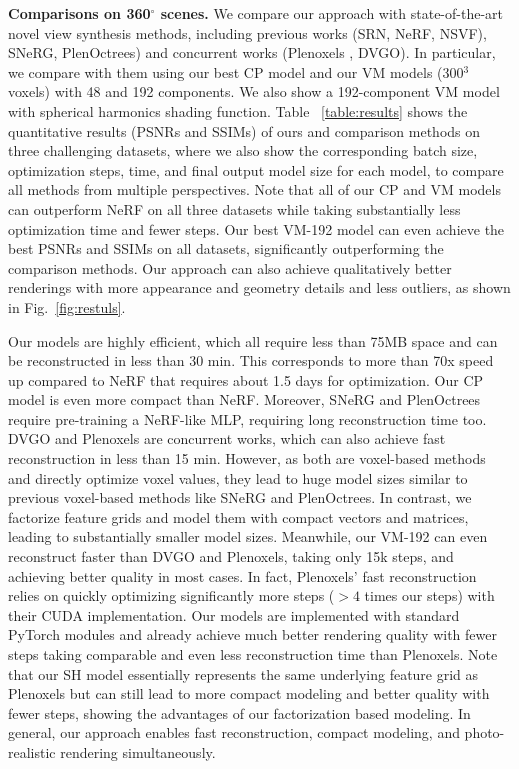 \documentclass[runningheads]{llncs}
\newcommand{\boldstartspace}[1]{\vspace{0.1in}\noindent\textbf{#1}}
\begin{document}
\boldstartspace{Comparisons on 360$^\circ$ scenes.}
We compare our approach with state-of-the-art novel view synthesis methods, including previous works (SRN\cite{sitzmann2019scene}, NeRF\cite{mildenhall2020nerf}, NSVF\cite{liu2020neural}), SNeRG\cite{hedman2021baking}, PlenOctrees\cite{yu2021plenoctrees}) and concurrent works (Plenoxels \cite{yu2021plenoxels}, DVGO\cite{sun2021direct}).
In particular, we compare with them using our best CP model and our VM models (300$^3$ voxels) with 48 and 192 components.
We also show a 192-component VM model with spherical harmonics shading function.
Table ~\ref{table:results} shows the quantitative results (PSNRs and SSIMs) of ours and comparison methods on three challenging datasets, where we also show the corresponding batch size, optimization steps, time, and final output model size for each model, to compare all methods from multiple perspectives. 
Note that all of our CP and VM models can outperform NeRF on all three datasets while taking substantially less optimization time and fewer steps.
Our best VM-192 model can even achieve the best PSNRs and SSIMs on all datasets, significantly outperforming the comparison methods.
Our approach can also achieve qualitatively better renderings with more appearance and geometry details and less outliers, as shown in 
Fig.~\ref{fig:restuls}.








Our models are highly efficient, which all require less than 75MB space and can be reconstructed in less than 30 min.
This corresponds to more than 70x speed up compared to NeRF that requires about 1.5 days for optimization.
Our CP model is even more compact than NeRF.
Moreover, SNeRG and PlenOctrees require pre-training a NeRF-like MLP, requiring long reconstruction time too.
DVGO and Plenoxels are concurrent works, which can also achieve fast reconstruction in less than 15 min. 
However, as both are voxel-based methods and directly optimize voxel values, they lead to huge model sizes 
similar to previous voxel-based methods like SNeRG and PlenOctrees.
In contrast, we factorize feature grids and model them with compact vectors and matrices, leading to substantially smaller model sizes.
Meanwhile, our VM-192 can even reconstruct faster than DVGO and Plenoxels, taking only 15k steps, and achieving better quality in most cases. 
In fact, Plenoxels' fast reconstruction relies on quickly optimizing significantly more steps ($>4$ times our steps) with their CUDA implementation. 
Our models are implemented with standard PyTorch modules and already achieve much better rendering quality with fewer steps taking comparable and even less reconstruction time than Plenoxels. Note that our SH model essentially represents the same underlying feature grid as Plenoxels but can still lead to more compact modeling and better quality with fewer steps, showing the advantages of our factorization based modeling.
In general, our approach enables fast reconstruction, compact modeling, and photo-realistic rendering simultaneously.
\end{document}
